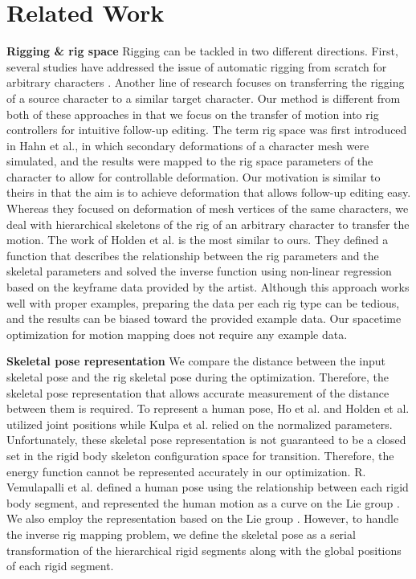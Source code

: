 \section{Related Work}
\textbf{Rigging \& rig space}
Rigging can be tackled in two different directions. 
First, several studies have addressed the issue of automatic rigging from scratch for arbitrary characters \cite{baran2007automatic,borosan2012rigmesh,bang2015interactive}. 
Another line of research focuses on transferring the rigging of a source character to a similar target character\cite{poirier2009rig,seo2010rigging}. Our method is different from both of these approaches in that we focus on the transfer of motion into rig controllers for intuitive follow-up editing.
The term rig space was first introduced in Hahn et al., in which secondary deformations of a character mesh were simulated, and the results were mapped to the rig space parameters of the character to allow for controllable deformation. 
Our motivation is similar to theirs in that the aim is to achieve deformation that allows follow-up editing easy. 
Whereas they focused on deformation of mesh vertices of the same characters, we deal with hierarchical skeletons of the rig of an arbitrary character to transfer the motion.
The work of Holden et al. is the most similar to ours. 
They defined a function that describes the relationship between the rig parameters and the skeletal parameters and solved the inverse function using non-linear regression based on the keyframe data provided by the artist. 
Although this approach works well with proper examples, preparing the data per each rig type can be tedious, and the results can be biased toward the provided example data. 
Our spacetime optimization for motion mapping does not require any example data.

\textbf{Skeletal pose representation}
We compare the distance between the input skeletal pose and the rig skeletal pose during the optimization. 
Therefore, the skeletal pose representation that allows accurate measurement of the distance between them is required. 
To represent a human pose, Ho et al. and Holden et al. utilized joint positions while Kulpa et al. relied on the normalized parameters. 
Unfortunately, these skeletal pose representation is not guaranteed to be a closed set in the rigid body skeleton configuration space for transition. 
Therefore, the energy function cannot be represented accurately in our optimization. 
R. Vemulapalli et al. defined a human pose using the relationship between each rigid body segment, and represented the human motion as a curve on the Lie group \SE{}. 
We also employ the representation based on the Lie group \SE{}. 
However, to handle the inverse rig mapping problem, we define the skeletal pose as a serial transformation of the hierarchical rigid segments along with the global positions of each rigid segment.

